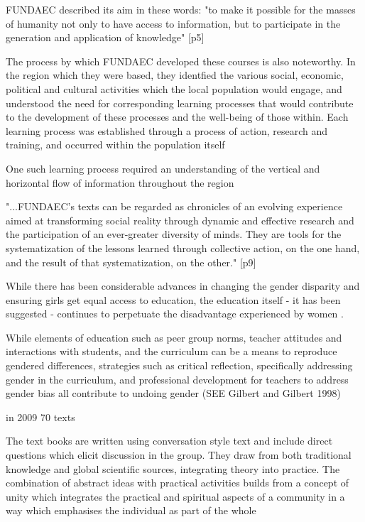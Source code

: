 FUNDAEC described its aim in these words: "to make it possible for the masses of humanity not only to have access to information, but to participate in the generation and application of knowledge" [p5] \citep{Arbab2007}

The process by which FUNDAEC developed these courses is also noteworthy. In the region which they were based, they identfied the various social, economic, political and cultural activities which the local population would engage, and understood the need for corresponding learning processes that would contribute to the development of these processes and the well-being of those within. Each learning process was established through a process of action, research and training, and occurred within the population itself \citep{Arbab2007}


One such learning process required an understanding of the vertical and horizontal flow of information throughout the region \citep{Arbab2007}

"...FUNDAEC’s texts can be regarded as chronicles of an evolving experience aimed at transforming social reality through dynamic and effective research and the participation of an ever-greater diversity of minds.  They are tools for the systematization of the lessons learned through collective action, on the one hand, and the result of that systematization, on the other." \citep{Arbab2007}[p9]







While there has been considerable advances in changing the gender disparity and ensuring girls get equal access to education, the education itself - it has been suggested - continues to perpetuate the disadvantage experienced by women \citep{Murphy-Graham2009}.

While elements of education such as peer group norms, teacher attitudes and interactions with students, and the curriculum can be a means to reproduce gendered differences, strategies such as critical reflection, specifically addressing gender in the curriculum, and professional development for teachers to address gender bias all contribute to undoing gender (SEE Gilbert and Gilbert 1998) \citep{Murphy-Graham2009}

in 2009 70 texts \citep{Murphy-Graham2009}

The text books are written using conversation style text and include direct questions which elicit discussion in the group. They draw from both traditional knowledge and global scientific sources, integrating theory into practice. The combination of abstract ideas with practical activities builds from a concept of unity which integrates the practical and spiritual aspects of a community in a way which emphasises the individual as part of the whole \citep{Murphy-Graham2009}



